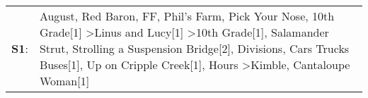 \begin{supertabular}{p{0.03\textwidth}p{0.92\textwidth}}
 \textbf{S1}:  &  August\textsuperscript{}, \enspace Red Baron\textsuperscript{}, \enspace FF\textsuperscript{}, \enspace Phil's Farm\textsuperscript{}, \enspace Pick Your Nose\textsuperscript{}, \enspace 10th Grade[1]\textsuperscript{} \textgreater \enspace Linus and Lucy[1]\textsuperscript{} \textgreater \enspace 10th Grade[1]\textsuperscript{}, \enspace Salamander Strut\textsuperscript{}, \enspace Strolling a Suspension Bridge[2]\textsuperscript{}, \enspace Divisions\textsuperscript{}, \enspace Cars Trucks Buses[1]\textsuperscript{}, \enspace Up on Cripple Creek[1]\textsuperscript{}, \enspace Hours\textsuperscript{} \textgreater \enspace Kimble\textsuperscript{}, \enspace Cantaloupe Woman[1]\textsuperscript{}  \enspace  \\
\end{supertabular}
